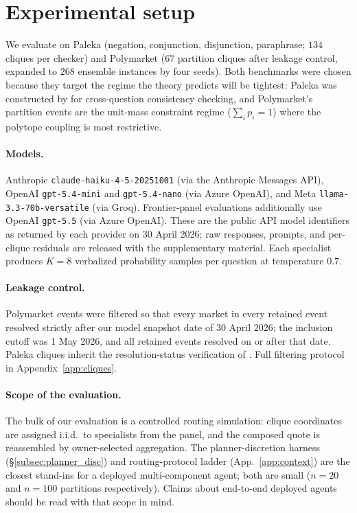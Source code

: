 \documentclass{article}
\theoremstyle{plain}
\theoremstyle{definition}
\theoremstyle{remark}
\begin{document}
\section{Experimental setup}
\label{sec:exp}
\label{subsec:exp_setup}

We evaluate on Paleka \citep{paleka2024consistency} (negation,
conjunction, disjunction, paraphrase; $134$ cliques per checker)
and Polymarket ($67$ partition cliques after leakage control,
expanded to $268$ ensemble instances by four seeds). Both
benchmarks were chosen because they target the regime the theory
predicts will be tightest: Paleka was constructed by
\citet{paleka2024consistency} for cross-question consistency
checking, and Polymarket's partition events are the unit-mass
constraint regime ($\sum_i p_i = 1$) where the polytope coupling
is most restrictive.

\paragraph{Models.}
Anthropic \texttt{claude-haiku-4-5-20251001} (via the Anthropic
Messages API), OpenAI \texttt{gpt-5.4-mini} and \texttt{gpt-5.4-nano}
(via Azure OpenAI), and Meta \texttt{llama-3.3-70b-versatile} (via
Groq). Frontier-panel evaluations additionally use OpenAI
\texttt{gpt-5.5} (via Azure OpenAI). These are the public API model
identifiers as returned by each provider on 30 April 2026; raw
responses, prompts, and per-clique residuals are released with the
supplementary material. Each specialist produces
$K{=}8$
verbalized probability samples per question at temperature $0.7$.

\paragraph{Leakage control.}
Polymarket events were filtered so that
every market in every retained event resolved strictly after our
model snapshot date of 30 April 2026; the inclusion cutoff was
1 May 2026, and all retained events resolved on or after that
date. Paleka cliques inherit the resolution-status verification
of \citet{paleka2024consistency}. Full filtering protocol in
Appendix~\ref{app:cliques}.

\paragraph{Scope of the evaluation.}
The bulk of our evaluation is a controlled routing simulation:
clique coordinates are assigned i.i.d.\ to specialists from the
panel, and the composed quote is reassembled by owner-selected
aggregation. The planner-discretion harness
(\S\ref{subsec:planner_disc}) and routing-protocol ladder
(App.~\ref{app:context}) are the closest stand-ins for a deployed
multi-component agent; both are small ($n\!=\!20$ and $n\!=\!100$
partitions respectively). Claims about end-to-end deployed agents
should be read with that scope in mind.
\end{document}
